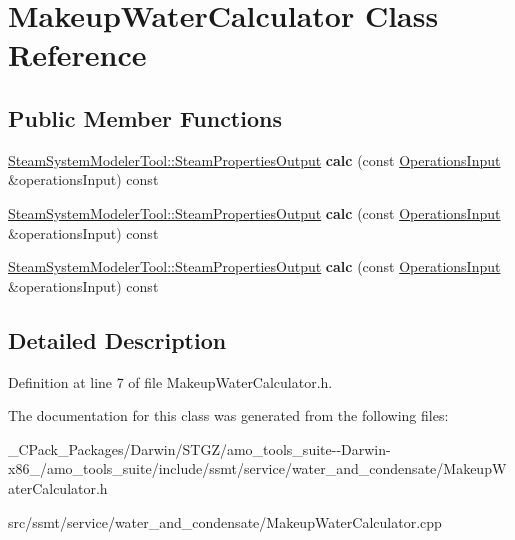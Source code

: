 \hypertarget{class_makeup_water_calculator}{}\section{Makeup\+Water\+Calculator Class Reference}
\label{class_makeup_water_calculator}
\subsection*{Public Member Functions}
\begin{DoxyCompactItemize}
\item 
\mbox{\label{class_makeup_water_calculator_add5dffda489a80b527f5bec7797d194c}} 
\hyperlink{struct_steam_system_modeler_tool_1_1_steam_properties_output}{Steam\+System\+Modeler\+Tool\+::\+Steam\+Properties\+Output} {\bfseries calc} (const \hyperlink{class_operations_input}{Operations\+Input} \&operations\+Input) const
\item 
\mbox{\label{class_makeup_water_calculator_add5dffda489a80b527f5bec7797d194c}} 
\hyperlink{struct_steam_system_modeler_tool_1_1_steam_properties_output}{Steam\+System\+Modeler\+Tool\+::\+Steam\+Properties\+Output} {\bfseries calc} (const \hyperlink{class_operations_input}{Operations\+Input} \&operations\+Input) const
\item 
\mbox{\label{class_makeup_water_calculator_add5dffda489a80b527f5bec7797d194c}} 
\hyperlink{struct_steam_system_modeler_tool_1_1_steam_properties_output}{Steam\+System\+Modeler\+Tool\+::\+Steam\+Properties\+Output} {\bfseries calc} (const \hyperlink{class_operations_input}{Operations\+Input} \&operations\+Input) const
\end{DoxyCompactItemize}


\subsection{Detailed Description}


Definition at line 7 of file Makeup\+Water\+Calculator.\+h.



The documentation for this class was generated from the following files\+:\begin{DoxyCompactItemize}
\item 
\+\_\+\+C\+Pack\+\_\+\+Packages/\+Darwin/\+S\+T\+G\+Z/amo\+\_\+tools\+\_\+suite-\/-\/\+Darwin-\/x86\+\_/amo\+\_\+tools\+\_\+suite/include/ssmt/service/water\+\_\+and\+\_\+condensate/Makeup\+Water\+Calculator.\+h\item 
src/ssmt/service/water\+\_\+and\+\_\+condensate/Makeup\+Water\+Calculator.\+cpp\end{DoxyCompactItemize}
